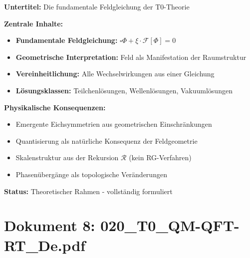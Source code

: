 	\begin{documentbox}
		\textbf{Untertitel:} Die fundamentale Feldgleichung der T0-Theorie
		
		\textbf{Zentrale Inhalte:}
		\begin{itemize}
			\item \textbf{Fundamentale Feldgleichung:} $\square \Phi + \xi \cdot \mathcal{F}[\Phi] = 0$
			\item \textbf{Geometrische Interpretation:} Feld als Manifestation der Raumstruktur
			\item \textbf{Vereinheitlichung:} Alle Wechselwirkungen aus einer Gleichung
			\item \textbf{Lösungsklassen:} Teilchenlösungen, Wellenlösungen, Vakuumlösungen
		\end{itemize}
		
		\textbf{Physikalische Konsequenzen:}
		\begin{itemize}
			\item Emergente Eichsymmetrien aus geometrischen Einschränkungen
			\item Quantisierung als natürliche Konsequenz der Feldgeometrie
			\item Skalenstruktur aus der Rekursion $\mathcal{R}$ (kein RG-Verfahren)
			\item Phasenübergänge als topologische Veränderungen
		\end{itemize}
		
		\textbf{Status:} Theoretischer Rahmen - vollständig formuliert
	\end{documentbox}
	
	\section{Dokument 8: 020\_T0\_QM-QFT-RT\_De.pdf}
	
